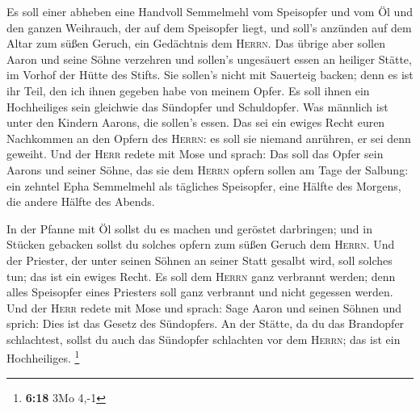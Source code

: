  Es soll einer abheben eine Handvoll Semmelmehl vom
Speisopfer und vom Öl und den ganzen Weihrauch, der auf dem Speisopfer
liegt, und soll's anzünden auf dem Altar zum süßen Geruch, ein
Gedächtnis dem \textsc{Herrn}.  Das übrige aber sollen
Aaron und seine Söhne verzehren und sollen's ungesäuert essen an
heiliger Stätte, im Vorhof der Hütte des Stifts.  Sie
sollen's nicht mit Sauerteig backen; denn es ist ihr Teil, den ich ihnen
gegeben habe von meinem Opfer. Es soll ihnen ein Hochheiliges sein
gleichwie das Sündopfer und Schuldopfer.  Was männlich
ist unter den Kindern Aarons, die sollen's essen. Das sei ein ewiges
Recht euren Nachkommen an den Opfern des \textsc{Herrn}: es soll sie
niemand anrühren, er sei denn geweiht.  Und der
\textsc{Herr} redete mit Mose und sprach:  Das soll das
Opfer sein Aarons und seiner Söhne, das sie dem \textsc{Herrn} opfern
sollen am Tage der Salbung: ein zehntel Epha Semmelmehl als tägliches
Speisopfer, eine Hälfte des Morgens, die andere Hälfte des Abends.

 In der Pfanne mit Öl sollst du es machen und geröstet
darbringen; und in Stücken gebacken sollst du solches opfern zum süßen
Geruch dem \textsc{Herrn}.  Und der Priester, der unter
seinen Söhnen an seiner Statt gesalbt wird, soll solches tun; das ist
ein ewiges Recht. Es soll dem \textsc{Herrn} ganz verbrannt werden;
 denn alles Speisopfer eines Priesters soll ganz
verbrannt und nicht gegessen werden.  Und der
\textsc{Herr} redete mit Mose und sprach:  Sage Aaron und
seinen Söhnen und sprich: Dies ist das Gesetz des Sündopfers. An der
Stätte, da du das Brandopfer schlachtest, sollst du auch das Sündopfer
schlachten vor dem \textsc{Herrn}; das ist ein Hochheiliges. \footnote{\textbf{6:18}
  3Mo 4,-1}

